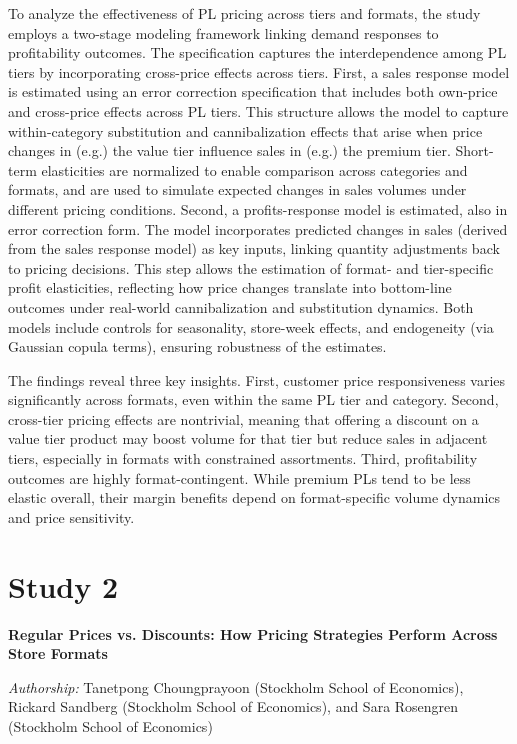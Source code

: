 To analyze the effectiveness of PL pricing across tiers and formats, the study employs a two-stage modeling framework linking demand responses to profitability outcomes. The specification captures the interdependence among PL tiers by incorporating cross-price effects across tiers. First, a sales response model is estimated using an error correction specification that includes both own-price and cross-price effects across PL tiers. This structure allows the model to capture within-category substitution and cannibalization effects that arise when price changes in (e.g.) the value tier influence sales in (e.g.) the premium tier. Short-term elasticities are normalized to enable comparison across categories and formats, and are used to simulate expected changes in sales volumes under different pricing conditions. Second, a profits-response model is estimated, also in error correction form. The model incorporates predicted changes in sales (derived from the sales response model) as key inputs, linking quantity adjustments back to pricing decisions. This step allows the estimation of format- and tier-specific profit elasticities, reflecting how price changes translate into bottom-line outcomes under real-world cannibalization and substitution dynamics. Both models include controls for seasonality, store-week effects, and endogeneity (via Gaussian copula terms), ensuring robustness of the estimates.

The findings reveal three key insights. First, customer price responsiveness varies significantly across formats, even within the same PL tier and category. Second, cross-tier pricing effects are nontrivial, meaning that offering a discount on a value tier product may boost volume for that tier but reduce sales in adjacent tiers, especially in formats with constrained assortments. Third, profitability outcomes are highly format-contingent. While premium PLs tend to be less elastic overall, their margin benefits depend on format-specific volume dynamics and price sensitivity.


\section{Study 2}
\textbf{Regular Prices vs. Discounts: How Pricing
Strategies Perform Across Store Formats}

\noindent
\textit{Authorship:} Tanetpong Choungprayoon (Stockholm School of Economics), Rickard Sandberg (Stockholm School of Economics), and Sara Rosengren (Stockholm School of Economics)

